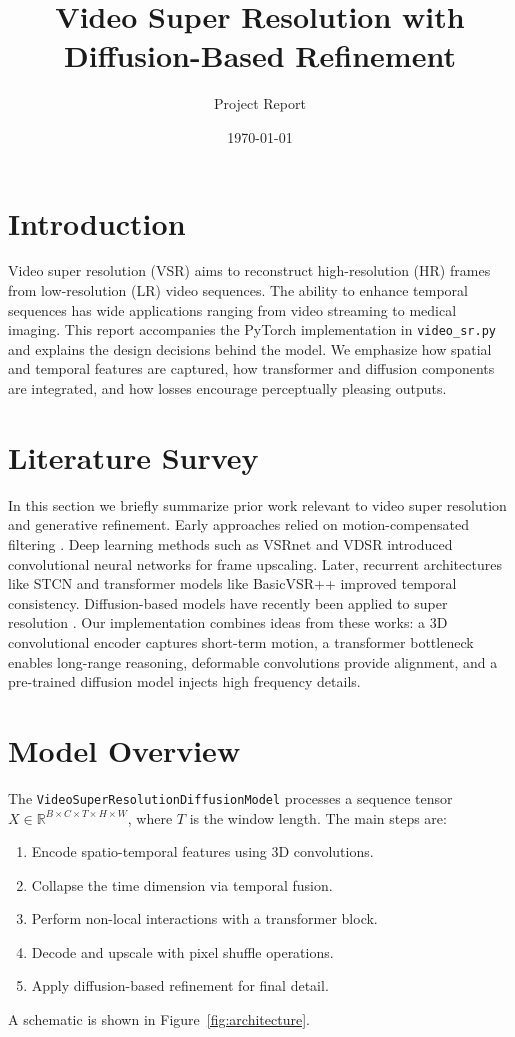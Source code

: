 \documentclass{article}
\title{Video Super Resolution with Diffusion-Based Refinement}
\author{Project Report}
\date{\today}
\begin{document}
\maketitle
\tableofcontents
\newpage
\section{Introduction}
Video super resolution (VSR) aims to reconstruct high-resolution (HR) frames from low-resolution (LR) video sequences. The ability to enhance temporal sequences has wide applications ranging from video streaming to medical imaging. This report accompanies the PyTorch implementation in \texttt{video\_sr.py} and explains the design decisions behind the model. We emphasize how spatial and temporal features are captured, how transformer and diffusion components are integrated, and how losses encourage perceptually pleasing outputs.

\section{Literature Survey}
In this section we briefly summarize prior work relevant to video super resolution and generative refinement. Early approaches relied on motion-compensated filtering \cite{Tekalp1995}. Deep learning methods such as VSRnet \cite{Kappeler2016} and VDSR \cite{Kim2016} introduced convolutional neural networks for frame upscaling. Later, recurrent architectures like STCN \cite{Dai2017} and transformer models like BasicVSR++ \cite{Chan2022} improved temporal consistency. Diffusion-based models have recently been applied to super resolution \cite{Saharia2022}. Our implementation combines ideas from these works: a 3D convolutional encoder captures short-term motion, a transformer bottleneck enables long-range reasoning, deformable convolutions provide alignment, and a pre-trained diffusion model injects high frequency details.

\section{Model Overview}
The \texttt{VideoSuperResolutionDiffusionModel} processes a sequence tensor $X \in \mathbb{R}^{B\times C\times T\times H\times W}$, where $T$ is the window length. The main steps are:
\begin{enumerate}
\item Encode spatio-temporal features using 3D convolutions.
\item Collapse the time dimension via temporal fusion.
\item Perform non-local interactions with a transformer block.
\item Decode and upscale with pixel shuffle operations.
\item Apply diffusion-based refinement for final detail.
\end{enumerate}
A schematic is shown in Figure~\ref{fig:architecture}.
\end{document}
